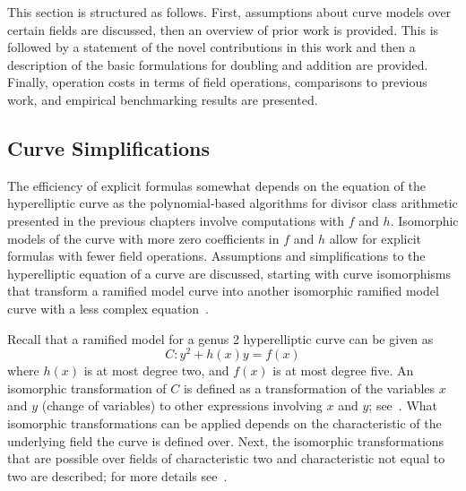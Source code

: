 This section is structured as follows. First, assumptions about curve models
over certain fields are discussed, then an overview of prior work is provided.
This is followed by a statement of the novel contributions in this work and then
a description of the basic formulations for doubling and addition are provided.
Finally, operation costs in terms of field operations, comparisons to
previous work, and empirical benchmarking results are presented.

\subsection{Curve Simplifications} 
\label{sect:curvesimplifications} 
The efficiency of explicit formulas somewhat depends on the equation of the
hyperelliptic curve as the polynomial-based algorithms for divisor class
arithmetic presented in the previous chapters involve computations with $f$ and
$h$. Isomorphic models of the curve with more zero coefficients in $f$ and $h$
allow for explicit formulas with fewer field operations. Assumptions and
simplifications to the hyperelliptic equation of a curve are discussed, starting
with curve isomorphisms that transform a ramified model curve into another
isomorphic ramified model curve with a less complex
equation~\cite{HandbookHECC_2006}. 

Recall that a ramified model for a genus 2 hyperelliptic curve can be given as
$$C : y^2 + h(x)y = f(x) $$ where $h(x)$ is at most degree two, and $f(x)$ is at
most degree five. An isomorphic transformation of $C$ is defined as a
transformation of the variables $x$ and $y$ (change of variables) to other
expressions involving $x$ and $y$; see~\cite{HandbookHECC_2006}. What isomorphic
transformations can be applied depends on the characteristic of the underlying
field the curve is defined over. Next, the isomorphic transformations that are
possible over fields of characteristic two and characteristic not equal to two are
described; for more details see~\cite{Lange_explicit_2005}. 

